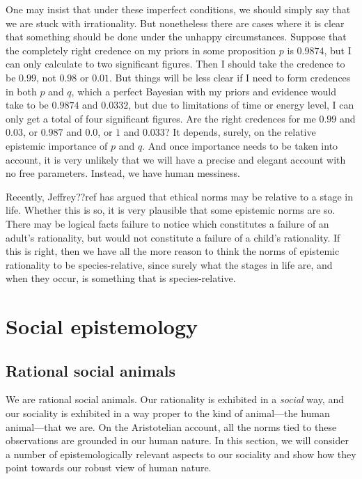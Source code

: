 One may insist that under these imperfect conditions, we should simply say that we are stuck with irrationality.
But nonetheless there are cases where it is clear that something should be done under the unhappy circumstances.
Suppose that the completely right credence on my priors in some proposition $p$ is $0.9874$, 
but I can only calculate to two significant figures. Then I should take the credence to be $0.99$, not $0.98$ or 
$0.01$. But things will be less clear if I need to form credences in both $p$ and $q$, which a perfect Bayesian
with my priors and evidence would take to be $0.9874$ and $0.0332$, but due to limitations of
time or energy level, I can only get a total of four significant figures. Are the right credences for me $0.99$
and $0.03$, or $0.987$ and $0.0$, or $1$ and $0.033$? It depends, surely, on the relative epistemic importance of $p$ and
$q$. And once importance needs to be taken into account, it is very unlikely that we will have a precise and elegant
account with no free parameters. Instead, we have human messiness.

Recently, Jeffrey??ref has argued that ethical norms may be relative to a stage in life. Whether this is so, it is very
plausible that some epistemic norms are so. There may be logical facts failure to notice which constitutes a failure of 
an adult's rationality, but would not constitute a failure of a child's rationality. If this is right, then we have all
the more reason to think the norms of epistemic rationality to be species-relative, since surely what the stages in 
life are, and when they occur, is something that is species-relative.

\section{Social epistemology}
\subsection{Rational social animals}
We are rational social animals. Our rationality is exhibited in a \textit{social} way, and our sociality is
exhibited in a way proper to the kind of animal---the human animal---that we are. On the Aristotelian account,
all the norms tied to these observations are grounded in our human nature. In this section, we will consider a
number of epistemologically relevant aspects to our sociality and show how they point towards our robust view
of human nature.


